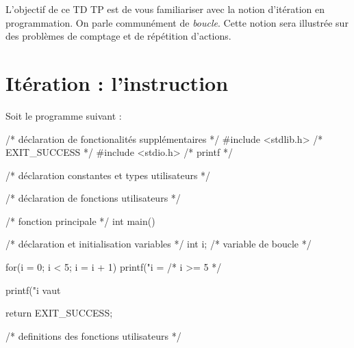 
\newcommand{\commentaire}[1]{}


\vspace{-1cm}
L'objectif de ce TD TP est de vous familiariser avec la notion
d'itération en programmation. On parle communément de
\emph{boucle}. Cette notion sera illustrée sur des problèmes de comptage
et de répétition d'actions. 


\section{Itération : l'instruction }


Soit le programme suivant :
{\small
\begin{listing}{1}
/* déclaration de fonctionalités supplémentaires */
#include <stdlib.h> /* EXIT_SUCCESS */
#include <stdio.h> /* printf */

/* déclaration constantes et types utilisateurs */

/* déclaration de fonctions utilisateurs */

/* fonction principale */
int main()
{
    /* déclaration et initialisation variables */
    int i; /* variable de boucle */

    for(i = 0; i < 5; i = i + 1)
    {
        printf("i = %
    }
    /* i >= 5 */

    printf("i vaut %

    return EXIT_SUCCESS;
}

/* definitions des fonctions utilisateurs */
\end{listing}
}


